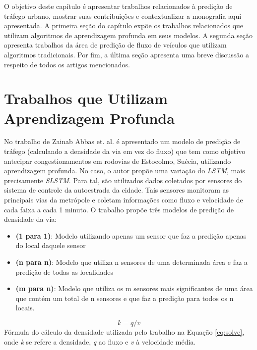 \label{chapter:trabalhos_relacionados}

O objetivo deste capítulo é apresentar trabalhos relacionados à predição de tráfego urbano, mostrar suas contribuições e contextualizar a monografia aqui apresentada. A primeira seção do capítulo expõe os trabalhos relacionados que utilizam algoritmos de aprendizagem profunda em seus modelos. A segunda seção apresenta trabalhos da área de predição de fluxo de veículos que utilizam algoritmos tradicionais. Por fim, a última seção apresenta uma breve discussão a respeito de todos os artigos mencionados.

\section{Trabalhos que Utilizam Aprendizagem Profunda}

No trabalho de Zainab Abbas et. al. \cite{Zainab_2018} é apresentado um modelo de predição de tráfego (calculando a densidade da via em vez do fluxo) que tem como objetivo antecipar congestionamentos em rodovias de Estocolmo, Suécia, utilizando aprendizagem profunda. No caso, o autor propõe uma variação do \textit{\acrshort{LSTM}}, mais precisamente \textit{\acrfull{SLSTM}}. Para tal, são utilizados dados coletados por sensores do sistema de controle da autoestrada da cidade. Tais sensores monitoram as principais vias da metrópole e coletam informações como fluxo e velocidade de cada faixa a cada 1 minuto. O trabalho propõe três modelos de predição de densidade da via:

\begin{itemize}
    \item \textbf{(1 para 1)}: Modelo utilizando apenas um sensor que faz a predição apenas do local daquele sensor
    \item \textbf{(n para n)}: Modelo que utiliza n sensores de uma determinada área e faz a predição de todas as localidades
    \item \textbf{(m para n)}: Modelo que utiliza os m sensores mais significantes de uma área que contém um total de n sensores e que faz a predição para todos os n locais.
\end{itemize}

\begin{equation}\label{eq:solve}
k = q / v
\end{equation}
Fórmula do cálculo da densidade utilizada pelo trabalho na Equação \ref{eq:solve}, onde \textit{k} se refere a densidade, \textit{q} ao fluxo e \textit{v} à velocidade média.

